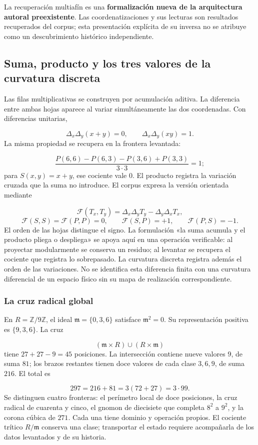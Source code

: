 La recuperación multiafín es una \textbf{formalización nueva de la arquitectura autoral preexistente}. Las coordenatizaciones y sus lecturas son resultados recuperados del corpus; esta presentación explícita de su inversa no se atribuye como un descubrimiento histórico independiente.

\subsection{Suma, producto y los tres valores de la curvatura discreta}
Las filas multiplicativas se construyen por acumulación aditiva. La diferencia entre ambas hojas aparece al variar simultáneamente las dos coordenadas. Con diferencias unitarias,

\[
\Delta_x\Delta_y(x+y)=0,
\qquad
\Delta_x\Delta_y(xy)=1.
\]
La misma propiedad se recupera en la frontera levantada:

\[
\frac{P(6,6)-P(6,3)-P(3,6)+P(3,3)}{3\cdot3}=1;
\]
para \(S(x,y)=x+y\), ese cociente vale \(0\). El producto registra la variación cruzada que la suma no introduce. El corpus expresa la versión orientada mediante

\[
\mathcal F(T_x,T_y)=\Delta_x\Delta_yT_y-\Delta_y\Delta_xT_x,
\]
\[
\mathcal F(S,S)=\mathcal F(P,P)=0,
\qquad \mathcal F(S,P)=+1,
\qquad \mathcal F(P,S)=-1.
\]
El orden de las hojas distingue el signo. La formulación «la suma acumula y el producto pliega o despliega» se apoya aquí en una operación verificable: al proyectar modularmente se conserva un residuo; al levantar se recupera el cociente que registra lo sobrepasado. La curvatura discreta registra además el orden de las variaciones. No se identifica esta diferencia finita con una curvatura diferencial de un espacio físico sin su mapa de realización correspondiente.

\subsubsection*{La cruz radical global}
En \(R=\mathbb Z/9\mathbb Z\), el ideal \(\mathfrak m=\{0,3,6\}\) satisface \(\mathfrak m^2=0\). Su representación positiva es \(\{9,3,6\}\). La cruz

\[
(\mathfrak m\times R)\cup(R\times\mathfrak m)
\]
tiene \(27+27-9=45\) posiciones. La intersección contiene nueve valores \(9\), de suma \(81\); los brazos restantes tienen doce valores de cada clase \(3,6,9\), de suma \(216\). El total es

\[
297=216+81=3(72+27)=3\cdot99.
\]
Se distinguen cuatro fronteras: el perímetro local de doce posiciones, la cruz radical de cuarenta y cinco, el gnomon de diecisiete que completa \(8^2\) a \(9^2\), y la corona cúbica de \(271\). Cada una tiene dominio y operación propios. El cociente trítico \(R/\mathfrak m\) conserva una clase; transportar el estado requiere acompañarla de los datos levantados y de su historia.

